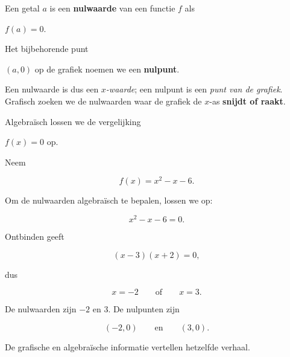 \documentclass{ximera}
\begin{document}
\begin{definitie}
Een getal \(a\) is een \textbf{nulwaarde} van een functie \(f\) als

\(
f(a)=0.
\)

Het bijbehorende punt

\(
(a,0)
\)
op de grafiek noemen we een \textbf{nulpunt}.
\end{definitie}

Een nulwaarde is dus een \emph{\(x\)-waarde}; een nulpunt is een \emph{punt van de grafiek}.
Grafisch zoeken we de nulwaarden waar de grafiek de \(x\)-as \textbf{snijdt of raakt}.

Algebraïsch lossen we de vergelijking

\(
f(x)=0
\)
op.

\begin{voorbeeld}

Neem

\[
f(x)=x^2-x-6.
\]

Om de nulwaarden algebraïsch te bepalen, lossen we op:

\[
x^2-x-6=0.
\]

Ontbinden geeft

\[
(x-3)(x+2)=0,
\]

dus

\[
x=-2
\qquad\text{of}\qquad
x=3.
\]

De nulwaarden zijn \(-2\) en \(3\).
De nulpunten zijn

\[
(-2,0)
\qquad\text{en}\qquad
(3,0).
\]

\begin{center}
\end{center}

De grafische en algebraïsche informatie vertellen hetzelfde verhaal.
\end{voorbeeld}


\end{document}

